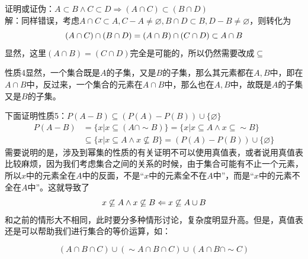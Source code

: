证明或证伪：$A\subset B\land C\subset D\Rightarrow (A\cap C)\subset (B\cap D)$\\
解：同样错误，考虑$A\cap C\subset A,C-A\ne\varnothing,B\cap D\subset B,D-B\ne\varnothing$，则转化为\vspace{-10pt}\[(A\cap C)\cap(B\cap D)=(A\cap B)\cap(C\cap D)\subset A\cap B\vspace{-10pt}\]
显然，这里$(A\cap B)=(C\cap D)$完全是可能的，所以仍然需要改成$\subseteq$

性质4显然，一个集合既是$A$的子集，又是$B$的子集，那么其元素都在$A,B$中，即在$A\cap B$中，反过来，一个集合的元素在$A\cap B$中，那么也在$A,B$中，故既是$A$的子集又是$B$的子集。

下面证明性质5：$ P(A - B) \subseteq (P(A) - P(B))\cup\{\varnothing\}$
\begin{align*}
P(A - B) &= \{x|x\subseteq (A\cap\sim B)\}=\{x|x\subseteq A\land x\subseteq\sim B\}\\
&\subseteq\{x|x\subseteq A\land x\not\subseteq B\}=(P(A)-P(B))\cup\{\varnothing\}
\end{align*}
需要说明的是，涉及到幂集的性质的有关证明不可以使用真值表，或者说用真值表比较麻烦，因为我们考虑集合之间的关系的时候，由于集合可能有不止一个元素，所以$x$中的元素全在$A$中的反面，不是“$x$中的元素全不在$A$中”，而是“$x$中的元素不全在$A$中”。这就导致了\vspace{-10pt}\[x\not\subseteq A\land x\not\subseteq B\Leftarrow x\not\subseteq A\cup B\vspace{-10pt}\]和之前的情形大不相同，此时要分多种情形讨论，复杂度明显升高。但是，真值表还是可以帮助我们进行集合的等价运算，如：
\begin{example}{}{}
\[(A\cap B\cap C)\cup(\sim A\cap B\cap C)\cup(A\cap B\cap\sim C)\]\end{example}
